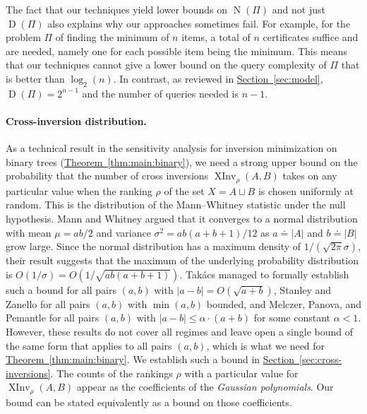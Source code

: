\documentclass[11pt]{article}
\numberwithin{equation}{section}
\theoremstyle{definition}
\theoremstyle{plain}
\newcommand{\expref}[2]{\hyperref[#2]{#1~\ref{#2}}}
\newcommand{\ranking}{\rho}
\DeclareMathOperator{\XInv}{XInv}
\DeclareMathOperator{\traces}{D}
\DeclareMathOperator{\NQ}{N}
\begin{document}
The fact that our techniques yield lower bounds on $\NQ(\Pi)$ and not just $\traces(\Pi)$ also explains why our approaches sometimes fail. For example, for the problem $\Pi$ of finding the minimum of $n$ items, a total of $n$ certificates suffice and are needed, namely one for each possible item being the minimum. This means that our techniques cannot give a lower bound on the query complexity of $\Pi$ that is better than $\log_2(n)$. In contrast, as reviewed in \expref{Section}{sec:model}, $\traces(\Pi)=2^{n-1}$ and the number of queries needed is $n-1$. 

\paragraph{Cross-inversion distribution.}
As a technical result in the sensitivity analysis for inversion minimization on binary trees (\expref{Theorem}{thm:main:binary}), we need a strong upper bound on the probability that the number of cross inversions $\XInv_\ranking(A,B)$ takes on any particular value when the ranking $\ranking$ of the set $X = A \sqcup B$ is chosen uniformly at random. This is the distribution of the Mann--Whitney statistic under the null hypothesis. Mann and Whitney \cite{MannWhitney1947} argued that it converges to a normal distribution with mean $\mu=ab/2$ and variance $\sigma^2=ab(a+b+1)/12$ as $a \doteq |A|$ and $b \doteq |B|$ grow large. Since the normal distribution has a maximum density of $1/(\sqrt{2\pi}\sigma)$, their result suggests that the maximum of the underlying probability distribution is $O(1/\sigma)=O(1/\sqrt{ab(a+b+1)})$. Tak\'acs \cite{Takacs1986} managed to formally establish such a bound for all pairs $(a,b)$ with $|a-b|=O(\sqrt{a+b})$, Stanley and Zanello \cite{SZ15} for all pairs $(a,b)$ with $\min(a,b)$ bounded, and Melczer, Panova, and Pemantle \cite{MPP20} for all pairs $(a,b)$ with $|a-b|\le \alpha\cdot(a+b)$ for some constant $\alpha<1$. However, these results do not cover all regimes and leave open a single bound of the same form that applies to all pairs $(a,b)$, which is what we need for \expref{Theorem}{thm:main:binary}. We establish such a bound in \expref{Section}{sec:cross-inversions}. The counts of the rankings $\ranking$ with a particular value for $\XInv_\ranking(A,B)$ appear as the coefficients of the \emph{Gaussian polynomials}.
Our bound can be stated equivalently as a bound on those coefficients.
\end{document}
